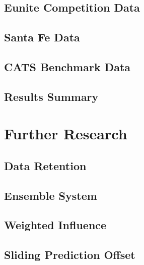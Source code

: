 \documentclass[10pt]{article}
\begin{document}
\subsection{Eunite Competition Data}


\subsection{Santa Fe Data}


\subsection{CATS Benchmark Data}


\subsection{Results Summary}


\section{Further Research}

\subsection{Data Retention}


\subsection{Ensemble System}




\subsection{Weighted Influence}

\subsection{ Sliding Prediction Offset }
\end{document}
